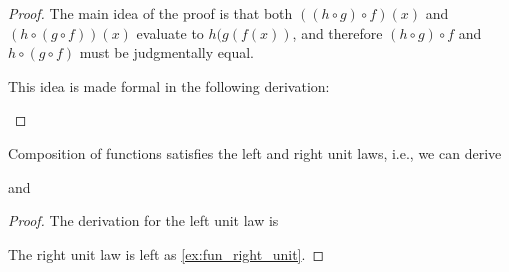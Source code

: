 \begin{proof}
  The main idea of the proof is that both $((h\circ g)\circ f)(x)$ and $(h\circ (g\circ f))(x)$ evaluate to $h(g(f(x))$, and therefore $(h\circ g)\circ f$ and $h\circ(g\circ f)$ must be judgmentally equal.

  This idea is made formal in the following derivation:
  \begin{prooftree}
  \end{prooftree}
\end{proof}

\begin{lem}\label{lem:fun_unit}
Composition of functions satisfies the left and right unit laws, i.e., we can derive
\begin{prooftree}
\end{prooftree}
and
\begin{prooftree}
\end{prooftree}
\end{lem}

\begin{proof}
The derivation for the left unit law is
\begin{prooftree}
\end{prooftree}
The right unit law is left as \autoref{ex:fun_right_unit}.
\end{proof}

